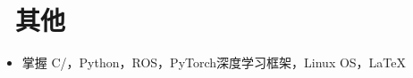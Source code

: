\documentclass[11pt]{article}
\begin{document}


\section{\texorpdfstring{\makebox[\widthof{\faTags}][c]{\color{ZZU_BLUE}\faTags}\ 其他}{其他}}

\begin{itemize}
    \item 掌握 C/\CC，Python，ROS，PyTorch深度学习框架，Linux OS，\LaTeX
\end{itemize}

\end{document}
